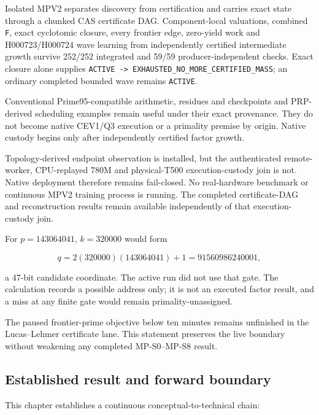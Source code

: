 Isolated MPV2 separates discovery from certification and carries exact
state through a chunked CAS certificate DAG. Component-local valuations,
combined \texttt{F}, exact cyclotomic closure, every frontier edge,
zero-yield work and H000723/H000724 wave learning from independently
certified intermediate growth survive 252/252 integrated and 59/59
producer-independent checks. Exact closure alone supplies
\texttt{ACTIVE\ -\textgreater{}\ \nolinkurl{EXHAUSTED_NO_MORE_CERTIFIED}\_MASS};
an ordinary completed bounded wave remains \texttt{ACTIVE}.

Conventional Prime95-compatible arithmetic, residues and checkpoints and
PRP-derived scheduling examples remain useful under their exact
provenance. They do not become native CEV1/Q3 execution or a primality
premise by origin. Native custody begins only after independently
certified factor growth.

Topology-derived endpoint observation is installed, but the
authenticated remote-worker, CPU-replayed 780M and physical-T500
execution-custody join is not. Native deployment therefore remains
fail-closed. No real-hardware benchmark or continuous MPV2 training
process is running. The completed certificate-DAG and reconstruction results remain available independently of that execution-custody join.

For \(p=143064041\), \(k=320000\) would form

\[
q=2(320000)(143064041)+1=91560986240001,
\]

a 47-bit candidate coordinate. The active run did not use that gate. The
calculation records a possible address only; it is not an executed
factor result, and a miss at any finite gate would remain
primality-unassigned.

The paused frontier-prime objective below ten minutes remains unfinished
in the Lucas--Lehmer certificate lane. This statement preserves the live
boundary without weakening any completed MP-S0--MP-S8 result.

\subsection{Established result and forward
boundary}\label{viii-ch10-established-result-and-forward-boundary}

This chapter establishes a continuous conceptual-to-technical chain:

